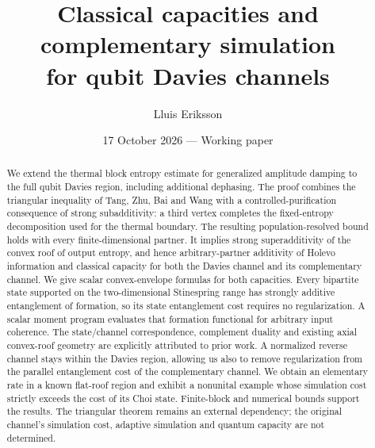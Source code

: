\documentclass[11pt]{article}
\title{Classical capacities and complementary simulation\\for qubit Davies channels}
\author{Lluis Eriksson}
\date{17 October 2026 --- Working paper}
\begin{document}
\maketitle
\begin{abstract}
We extend the thermal block entropy estimate for generalized amplitude damping to the full qubit Davies region, including additional dephasing. The proof combines the triangular inequality of Tang, Zhu, Bai and Wang with a controlled-purification consequence of strong subadditivity: a third vertex completes the fixed-entropy decomposition used for the thermal boundary. The resulting population-resolved bound holds with every finite-dimensional partner. It implies strong superadditivity of the convex roof of output entropy, and hence arbitrary-partner additivity of Holevo information and classical capacity for both the Davies channel and its complementary channel. We give scalar convex-envelope formulas for both capacities. Every bipartite state supported on the two-dimensional Stinespring range has strongly additive entanglement of formation, so its state entanglement cost requires no regularization. A scalar moment program evaluates that formation functional for arbitrary input coherence. The state/channel correspondence, complement duality and existing axial convex-roof geometry are explicitly attributed to prior work. A normalized reverse channel stays within the Davies region, allowing us also to remove regularization from the parallel entanglement cost of the complementary channel. We obtain an elementary rate in a known flat-roof region and exhibit a nonunital example whose simulation cost strictly exceeds the cost of its Choi state. Finite-block and numerical bounds support the results. The triangular theorem remains an external dependency; the original channel's simulation cost, adaptive simulation and quantum capacity are not determined.
\end{abstract}
\end{document}
